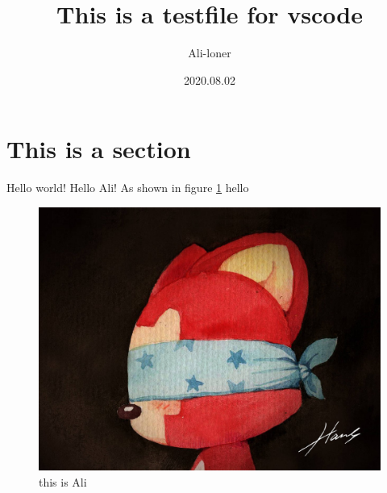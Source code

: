 \documentclass[fontset=windows]{article}
\title{\heiti\zihao{2} This is a testfile for vscode}
\author{\songti Ali-loner}
\date{2020.08.02}
\begin{document}
	\maketitle
	\thispagestyle{empty}

\begin{abstract}
	\lipsum[2]
\end{abstract}

\tableofcontents

\section{This is a section}
Hello world! Hello Ali! As shown in figure \ref{1}
hello
\begin{figure}[htbp]
	\centering
	\includegraphics[scale=0.2]{Ali.jpg}
	\caption{this is Ali}
	\label{1}
\end{figure}

\cite{knuth92}

\printbibliography[heading=bibintoc,title=参考文献]%
\end{document}
